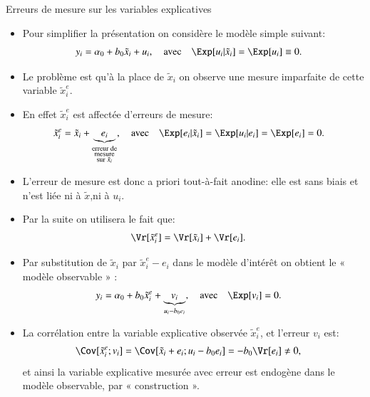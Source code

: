 \begin{frame}[allowframebreaks]{Erreurs de mesure sur les variables explicatives}
\begin{itemize}
\item Pour simplifier la présentation on considère le modèle simple suivant:
\begin{align*}
    y_i &= \alpha_0 + b_0\tilde{x}_i +u_i, 
    \quad \text{avec} \quad \Exp[u_i|\tilde{x}_i]= \Exp[u_i]\equiv 0.
\end{align*}
\item Le problème est qu'à la place de $\tilde{x}_i$ on observe une mesure imparfaite 
de cette variable $\tilde{x}_i^e$. 
\item En effet $\tilde{x}_i^e$  est affectée d'erreurs de mesure:
\begin{align*}
    \tilde{x}_i^e &= \tilde{x}_i + \underbrace{e_i}_{\substack{\text{erreur de}\\ 
    \text{mesure}\\\text{sur $\tilde{x}_i$}}} , \quad \text{avec} \quad \Exp[e_i|\tilde{x}_i]= \Exp[u_i|e_i]
    = \Exp[e_i] = 0.
\end{align*}
\item L’erreur de mesure est donc a priori tout-à-fait anodine: elle est sans biais
et n'est liée ni à $\tilde{x}$,ni à $u_i$.
\item Par la suite on utilisera le fait que: 
\begin{align}
    \Vr[\tilde{x}_i^e]&= \Vr[\tilde{x}_i] + \Vr[ e_i ] .
    \label{eq14}
\end{align}
\item Par substitution de $\tilde{x}_i$ par $\tilde{x}_i^e -e_i$ dans 
le modèle d’intérêt on obtient le « modèle observable » :
\begin{align*}
    y_i &= \alpha_0 + b_0\tilde{x}_i^e + \underbrace{v_i}_{u_i-b_0e_i}, 
    \quad \text{avec} \quad \Exp[ v_i ] =0.
\end{align*}
\item La corrélation entre la variable explicative observée $\tilde{x}_i^e$, et l'erreur $v_i$ est:
\begin{align*}
    \Cov[\tilde{x}_i^e;v_i]&=\Cov[\tilde{x}_i +e_i;u_i -b_0e_i]=-b_0\Vr[e_i] \neq 0,
\end{align*}
et ainsi la variable explicative mesurée avec erreur 
est endogène dans le modèle observable, par « construction ».


\end{itemize}
\end{frame}
